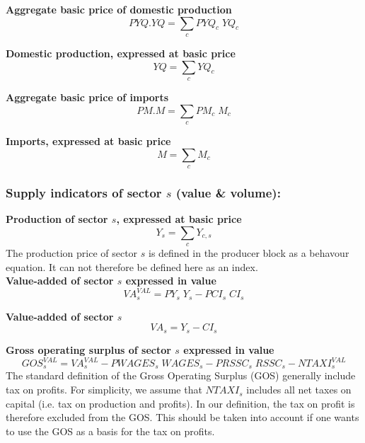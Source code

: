 \documentclass[12pt]{article}
\numberwithin{equation}{section}
\begin{document}
\noindent\textbf{Aggregate basic price of domestic production} \\
\begin{dmath}
PYQ . YQ = \sum_{c} PYQ_{c} \; YQ_{c}
\end{dmath}

\noindent\textbf{Domestic production, expressed at basic price} \\
\begin{dmath}
YQ = \sum_{c} YQ_{c}
\end{dmath}

\noindent\textbf{Aggregate basic price of imports} \\
\begin{dmath}
PM . M = \sum_{c} PM_{c} \; M_{c}
\end{dmath}

\noindent\textbf{Imports, expressed at basic price} \\
\begin{dmath}
M = \sum_{c} M_{c}
\end{dmath}




\subsubsection{Supply indicators of sector $s$ (value \& volume):}



\noindent\textbf{Production of sector $s$, expressed at basic price} \\
\begin{dmath}
Y_{s} = \sum_{c} Y_{c, s}
\end{dmath}
The production price of sector $s$ is defined in the producer block as a behavour equation. It can not therefore be defined here as an index. \\

\noindent\textbf{Value-added of sector $s$ expressed in value} \\
\begin{dmath}
VA^{VAL}_{s} = PY_{s} \; Y_{s} - PCI_{s} \; CI_{s}
\end{dmath}

\noindent\textbf{Value-added of sector $s$} \\
\begin{dmath}
VA_{s} = Y_{s} - CI_{s}
\end{dmath}

\noindent\textbf{Gross operating surplus of sector $s$ expressed in value} \\
\begin{dmath}
GOS^{VAL}_{s} = VA^{VAL}_{s} - PWAGES_{s} \; WAGES_{s} - PRSSC_{s} \; RSSC_{s} - NTAXI^{VAL}_{s}
\end{dmath}
The standard definition of the Gross Operating Surplus (GOS) generally include tax on profits. For simplicity, we assume that $NTAXI_{s}$ includes all net taxes on capital (i.e. tax on production and profits). In our definition, the tax on profit is therefore excluded from the GOS. This should be taken into account if one wants to use the GOS as a basis for the tax on profits. \\
\end{document}
